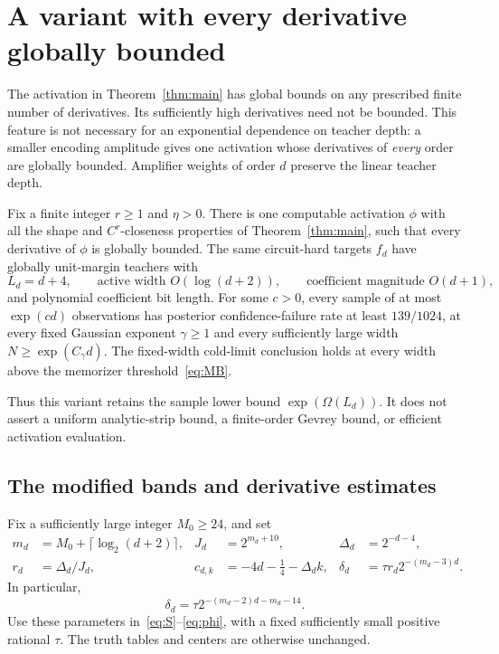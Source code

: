\section{A variant with every derivative globally bounded}
\label{app:all-derivatives}

The activation in Theorem~\ref{thm:main} has global bounds on any
prescribed finite number of derivatives. Its sufficiently high
derivatives need not be bounded. This feature is not necessary for an
exponential dependence on teacher depth: a smaller encoding amplitude gives
one activation whose derivatives of \emph{every} order are globally
bounded. Amplifier weights of order $d$ preserve the linear teacher depth.

\begin{theorem}\label{thm:all-derivatives}
Fix a finite integer $r\ge1$ and $\eta>0$. There is one computable
activation $\phi$ with all the shape and $C^r$-closeness properties of
Theorem~\ref{thm:main}, such that every derivative of $\phi$ is globally
bounded. The same circuit-hard targets $f_d$ have globally unit-margin
teachers with
\[
 L_d=d+4,\qquad
 \text{active width }O(\log(d+2)),\qquad
 \text{coefficient magnitude }O(d+1),
\]
and polynomial coefficient bit length. For some $c>0$, every sample
of at most $\exp(cd)$ observations has posterior confidence-failure
rate at least $139/1024$, at every fixed Gaussian exponent
$\gamma\ge1$ and every sufficiently large width
$N\ge\exp(C_\gamma d)$. The fixed-width cold-limit conclusion holds
at every width above the memorizer threshold~\eqref{eq:MB}.

Thus this variant retains the sample lower bound
$\exp(\Omega(L_d))$. It does not assert a uniform
analytic-strip bound, a finite-order Gevrey bound, or efficient
activation evaluation.
\end{theorem}

\subsection{The modified bands and derivative estimates}

Fix a sufficiently large integer $M_0\ge24$, and set
\begin{align*}
 m_d&=M_0+\lceil\log_2(d+2)\rceil,&
 J_d&=2^{m_d+10},&
 \Delta_d&=2^{-d-4},\\
 r_d&=\Delta_d/J_d,&
 c_{d,k}&=-4d-\tfrac14-\Delta_d k,&
 \delta_d&=\tau r_d2^{-(m_d-3)d}.
\end{align*}
In particular,
\begin{equation}\label{eq:all-derivative-amplitude}
 \delta_d=\tau2^{-(m_d-2)d-m_d-14}.
\end{equation}
Use these parameters in~\eqref{eq:S}--\eqref{eq:phi}, with a fixed
sufficiently small positive rational $\tau$. The truth tables and
centers are otherwise unchanged.

